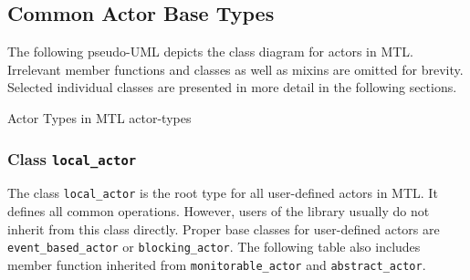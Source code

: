 \clearpage
\subsection{Common Actor Base Types}

The following pseudo-UML depicts the class diagram for actors in MTL.
Irrelevant member functions and classes as well as mixins are omitted for
brevity. Selected individual classes are presented in more detail in the
following sections.

%
          {Actor Types in MTL}%
          {actor-types}

\clearpage
\subsubsection{Class \lstinline^local_actor^}

The class \lstinline^local_actor^ is the root type for all user-defined actors
in MTL. It defines all common operations. However, users of the library
usually do not inherit from this class directly. Proper base classes for
user-defined actors are \lstinline^event_based_actor^ or
\lstinline^blocking_actor^. The following table also includes member function
inherited from \lstinline^monitorable_actor^ and \lstinline^abstract_actor^.

